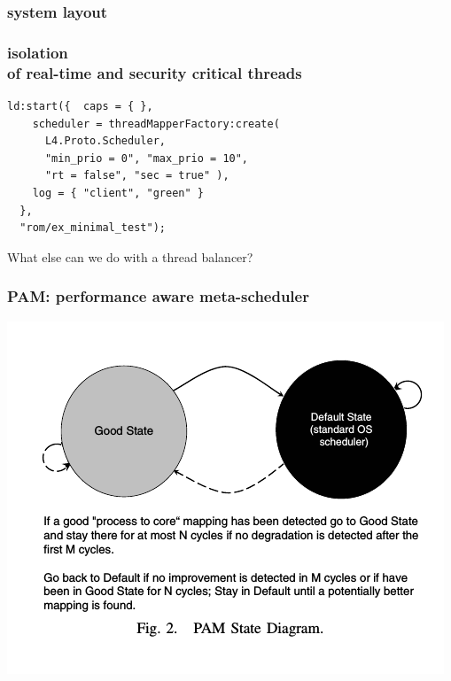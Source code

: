\documentclass[utf8,10pt]{beamer}
\begin{document}
\begin{frame}
  \frametitle{system layout}
  \centering
  
\end{frame}


\begin{frame}[fragile]
  \frametitle{isolation \\of real-time and security critical threads}
  \centering
  \begin{minipage}[c]{\columnwidth}
    \begin{verbatim}
ld:start({  caps = { },
    scheduler = threadMapperFactory:create(
      L4.Proto.Scheduler,
      "min_prio = 0", "max_prio = 10",
      "rt = false", "sec = true" ),
    log = { "client", "green" }
  },
  "rom/ex_minimal_test");
    \end{verbatim}
  \end{minipage}
\end{frame}


\begin{frame}
  \centering
  What else can we do with a thread balancer?
\end{frame}

\begin{frame}
  \frametitle{PAM: performance aware meta-scheduler}
  \centering
  \includegraphics[scale=.5]{./pam_state}
\end{frame}
\end{document}
